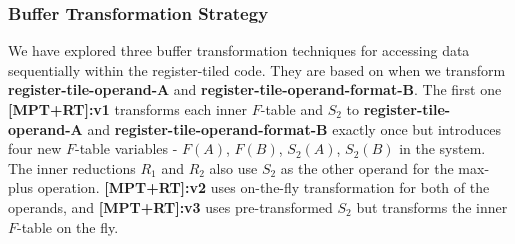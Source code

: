 \subsubsection{Buffer Transformation Strategy}
We have explored three buffer transformation techniques for accessing data sequentially within the register-tiled code. They are based on when we transform \textbf{register-tile-operand-A} and \textbf{register-tile-operand-format-B}. The first one \textbf{ [MPT+RT]:v1} transforms each inner $F$-table and $S_{2}$ to \textbf{register-tile-operand-A} and \textbf{register-tile-operand-format-B} exactly once but  introduces four new $F$-table variables - $F(A)$,  $F(B)$, $S_{2}(A)$, $S_{2}(B)$ in the system. The inner reductions $R_{1}$ and $R_{2}$ also use $S_{2}$ as the other operand for the max-plus operation. \textbf{ [MPT+RT]:v2} uses on-the-fly transformation for both of the operands, and \textbf{[MPT+RT]:v3} uses pre-transformed $S_{2}$ but transforms the inner $F$-table on the fly. 




